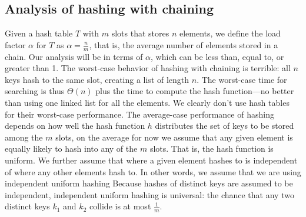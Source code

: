 \documentclass{report}
\begin{document}
\bigbreak \noindent 
\subsection{Analysis of hashing with chaining}
\bigbreak \noindent 
Given a hash table \( T \) with \( m \) slots that stores \( n \) elements, we define the load factor \( \alpha \) for \( T \) as \( \alpha = \frac{n}{m} \), that is, the average number of elements stored in a chain. Our analysis will be in terms of \( \alpha \), which can be less than, equal to, or greater than 1.
\bigbreak \noindent 
The worst-case behavior of hashing with chaining is terrible: all \( n \) keys hash to the same slot, creating a list of length \( n \). The worst-case time for searching is thus \( \Theta(n) \) plus the time to compute the hash function—no better than using one linked list for all the elements. We clearly don’t use hash tables for their worst-case performance.
\bigbreak \noindent 
The average-case performance of hashing depends on how well the hash function $h$ distributes the set of keys to be stored among the $m$ slots, on the average
\bigbreak \noindent 
for now we assume that any given element is equally likely to hash into any of the $m$ slots. That is, the hash function is uniform. We further assume that where a given element hashes to is independent of where any other elements hash to. In other words, we assume that we are using independent uniform hashing
\bigbreak \noindent 
Because hashes of distinct keys are assumed to be independent, independent uniform hashing is universal: the chance that any two distinct keys $k_{1}$ and $k_{2}$ collide is at most $\frac{1}{m}$.

\bigbreak \noindent 
\end{document}
